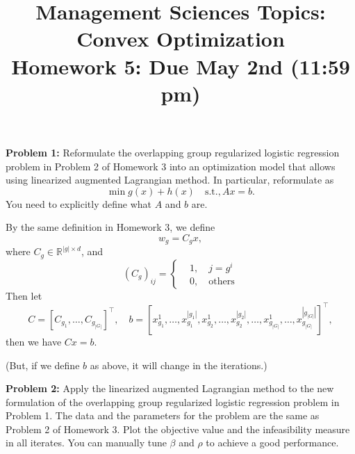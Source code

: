 \documentclass{article}
\begin{document}
\title{Management Sciences Topics: Convex Optimization\\ Homework 5: Due May 2nd (11:59 pm) }
\date{}

\maketitle

\noindent\textbf{Problem 1:}  Reformulate the overlapping group regularized logistic regression problem in Problem 2 of Homework 3 into an optimization model that allows using linearized augmented Lagrangian method. In particular, reformulate as 
$$
\min{g(x)+h(x)}\quad\text{s.t.}, Ax=b.
$$ 
You need to explicitly define what  $A$ and $b$ are.
\bigskip

By the same definition in Homework 3, we define
$$
w_g = C_g x,
$$
where $C_g \in\mathbb{R}^{|g|\times d} $, and
$$
(C_g)_{ij} = \left\{
\begin{aligned}
&1, \quad j = g^i \\
&0, \quad \text{others}
\end{aligned}
\right.
$$
Then let 
$$
C = [C_{g_1},\hdots, C_{g_{|G|}}]^\top, \quad b = [x_{g_1}^1, \hdots, x_{g_1}^{|g_1|}, x_{g_2}^1, \hdots, x_{g_2}^{|g_2|}, \hdots, x_{g_{|G|}}^{1}, \hdots, x_{g_{|G|}}^{|g_{|G|}|}]^\top,
$$
then we have $Cx = b$.

(But, if we define $b$ as above, it will change in the iterations.)
\bigskip

\noindent\textbf{Problem 2:}  Apply the linearized augmented Lagrangian method to the new formulation of the overlapping group regularized logistic regression problem 
in Problem 1. The data and the parameters for the problem are the same as  Problem 2 of Homework 3.
Plot the objective value and the infeasibility measure in all iterates. You can manually tune $\beta$ and $\rho$ to achieve a good performance. 
\end{document}
